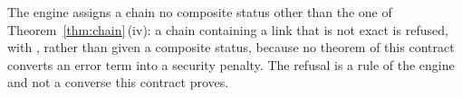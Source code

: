 
\begin{requirement}\label{req:mixed-status-chain}
The engine assigns a chain no composite status other than the one of
Theorem~\ref{thm:chain}\,(iv): a chain containing a link that is not
\textsf{exact} is refused, with
, rather than given a composite
status, because no theorem of this contract converts an error term into a
security penalty. The refusal is a rule of the engine and not a converse
this contract proves.
\end{requirement}
